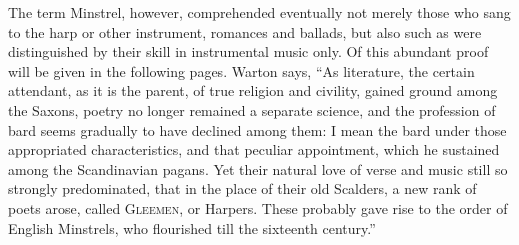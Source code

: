 The term Minstrel, however, comprehended eventually not mere\-ly those who
sang to the harp or other instrument, romances and ballads, but also such as
were distinguished by their skill in instrumental music only. Of this abundant
proof will be given in the following pages. Warton says, “As literature, the
certain attendant, as it is the parent, of true religion and civility, gained ground
among the Saxons, poetry no longer remained a separate science, and the profession
of bard seems gradually to have declined among them: I mean the bard
under those appropriated characteristics, and that peculiar appointment, which he
sustained among the Scandinavian pagans. Yet their natural love of verse and
music still so strongly predominated, that in the place of their old Scalders, a new
rank of poets arose, called \textsc{Gleemen}, or Harpers. 
These probably gave rise to
the order of English Minstrels, who flourished till the sixteenth century.”

